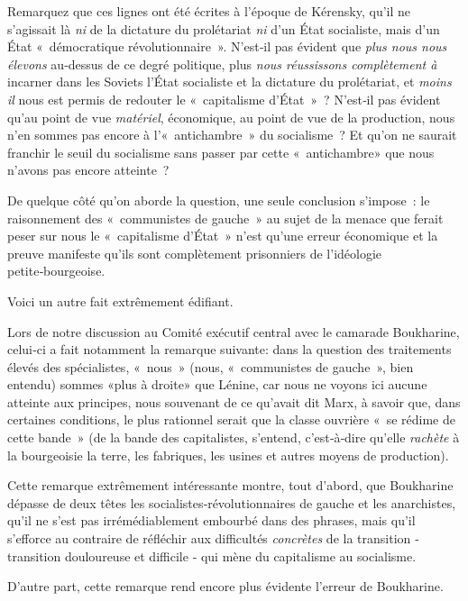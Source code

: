 \documentclass[french,twoside]{book} %
\begin{document}
\noindent Remarquez que ces lignes ont été écrites à l’époque de Kérensky, qu’il ne s’agissait là \emph{ni} de la dictature du prolétariat \emph{ni} d’un État socialiste, mais d’un État « démocratique révolutionnaire ». N'est‑il pas évident que \emph{plus nous nous élevons} au‑dessus de ce degré politique, plus \emph{nous réussissons complètement à} incarner dans les Soviets l’État socialiste et la dictature du prolétariat, et \emph{moins il} nous est permis de redouter le « capitalisme d’État » ? N'est‑il pas évident qu’au point de vue \emph{matériel}, économique, au point de vue de la production, nous n’en sommes pas encore à l’« antichambre » du socialisme ? Et qu’on ne saurait franchir le seuil du socialisme sans passer par cette « antichambre» que nous n’avons pas encore atteinte ?\par
De quelque côté qu’on aborde la question, une seule conclusion s’impose : le raisonnement des \hspace{1em}« communistes de gauche » au sujet de la menace que ferait peser sur nous le « capitalisme d’État » n’est qu’une erreur économique et la preuve manifeste qu’ils sont complètement prisonniers de l’idéologie petite‑bourgeoise.\par
Voici un autre fait extrêmement édifiant.\par
\bigbreak
\noindent Lors de notre discussion au Comité exécutif central avec le camarade Boukharine, celui‑ci a fait notamment la remarque suivante: dans la question des traitements élevés des spécialistes, « nous » (nous, « communistes de gauche », bien entendu) sommes «plus à droite» que Lénine, car nous ne voyons ici aucune atteinte aux principes, nous souvenant de ce qu’avait dit Marx, à savoir que, dans certaines conditions, le plus rationnel serait que la classe ouvrière « se rédime de cette bande » (de la bande des capitalistes, s’entend, c’est‑à‑dire qu’elle \emph{rachète} à la bourgeoisie la terre, les fabriques, les usines et autres moyens de production).\par
Cette remarque extrêmement intéressante montre, tout d’abord, que Boukharine dépasse de deux têtes les socialistes‑révolutionnaires de gauche et les anarchistes, qu’il ne s’est pas irrémédiablement embourbé dans des phrases, mais qu’il s’efforce au contraire de réfléchir aux difficultés \emph{concrètes} de la transition ‑ transition douloureuse et difficile ‑ qui mène du capitalisme au socialisme.\par
D'autre part, cette remarque rend encore plus évidente l’erreur de Boukharine.\par
\end{document}
